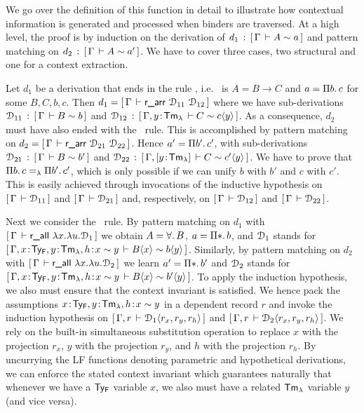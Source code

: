 We go over the definition of this function in detail to illustrate how contextual information is generated and processed when binders are traversed.
At a high level, the proof is by induction on the derivation of $d_1 \mathrel{\, : \,} [\,\Gamma\,\vdash A \mathrel{\sim} a\,]$ and pattern matching on $d_2 \mathrel{\, : \,} [\,\Gamma\,\vdash A \mathrel{\sim} a'\,]$.
We have to cover three cases, two structural and one for a context extraction.

Let $d_1$ be a derivation that ends in the rule \rarr, i.e.~ is $A = B \to C$ and $a = \Pi b.\,c$ for some $B,C,b,c$. Then $d_1 = [\,\Gamma\,\vdash \textsf{r\_arr}~\mathcal{D}_{11}~\mathcal{D}_{12}\,]$ where
we have sub-derivations $\mathcal{D}_{11} \mathrel{\, : \,} [\,\Gamma\,\vdash B \mathrel{\sim} b\,]$ and $\mathcal{D}_{12} \mathrel{\, : \,} [\,\Gamma, y \!:\! \mathsf{Tm_{\lambda}}\,\vdash C \mathrel{\sim} c\langle y\rangle\,]$.
As a consequence, $d_2$ must have also ended with the \rarr~rule. This is accomplished by pattern matching on $d_2 = [\,\Gamma\,\vdash \textsf{r\_arr}~\mathcal{D}_{21}~\mathcal{D}_{22}\,]$. Hence $a' = \Pi b'.\,c'$, with sub-derivations $\mathcal{D}_{21} \mathrel{\, : \,} [\,\Gamma\,\vdash B \mathrel{\sim} b'\,]$ and $\mathcal{D}_{22} \mathrel{\, : \,} [\,\Gamma, [y \!:\! \mathsf{Tm_{\lambda}}]\,\vdash C \mathrel{\sim} c'\langle y\rangle\,]$.
We have to prove that $\Pi b.\,c =_{\lambda} \Pi b'.\,c'$, which is only possible if we can unify $b$ with $b'$ and $c$ with $c'$.
This is easily achieved through invocations of the inductive hypothesis on $[\,\Gamma\,\vdash \mathcal{D}_{11}\,]$ and $[\,\Gamma\,\vdash \mathcal{D}_{21}\,]$ and, respectively, on $[\,\Gamma\,\vdash \mathcal{D}_{12}\,]$ and $[\,\Gamma\,\vdash \mathcal{D}_{22}\,]$.

Next we consider the \rall~rule. By pattern matching on $d_1$ with $[\,\Gamma\,\vdash \textsf{r\_all}~\lambda x.\lambda u.\mathcal{D}_1\,]$ we obtain $A = \forall.\, B$, $a = \Prod{\Prp} b$,
and $\mathcal{D}_1$ stands for $[\,\Gamma, x \!:\! \mathsf{Ty_{F}}, y \!:\! \mathsf{Tm_{\lambda}}, h \!:\! x \mathrel{\sim} y\,\vdash B\langle x\rangle \mathrel{\sim} b\langle y\rangle\,]$.
Similarly, by pattern matching on $d_2$ with $[\,\Gamma\,\vdash \textsf{r\_all}~\lambda x.\lambda u.\mathcal{D}_2\,]$ we learn $a' = \Prod{\Prp} b'$ and $\mathcal{D}_2$ stands for
$[\,\Gamma, x \!:\! \mathsf{Ty_{F}}, y \!:\! \mathsf{Tm_{\lambda}}, h \!:\! x \mathrel{\sim} y\,\vdash B\langle x\rangle \mathrel{\sim} b'\langle y\rangle\,]$.
%
To apply the induction hypothesis, we also must ensure that the context invariant is satisfied. We hence pack the assumptions $ x \!:\! \mathsf{Ty_{F}}, y \!:\! \mathsf{Tm_{\lambda}}, h \!:\! x \mathrel{\sim} y$ in a dependent record $r$ and
invoke the induction hypothesis on $[\,\Gamma, r\,\vdash \mathcal{D}_1\langle r_x,r_y,r_h\rangle\,]$ and $[\,\Gamma, r\,\vdash \mathcal{D}_2\langle r_x,r_y,r_h\rangle\,]$. We rely on the built-in simultaneous substitution operation to replace $x$ with the projection $r_x$, $y$ with the projection $r_y$, and $h$ with the projection $r_h$. By uncurrying the LF functions denoting parametric and hypothetical derivations, we can enforce the stated context invariant which guarantees naturally that whenever we have a $\mathsf{Ty_{F}}$ variable $x$, we also must have a related  $\mathsf{Tm_{\lambda}}$ variable $y$ (and vice versa).

